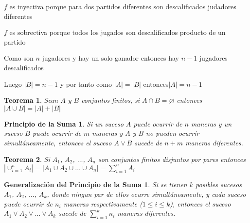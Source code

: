 \documentclass[a4paper,12pt]{report}
\newtheorem*{psm}{Principio de la Suma}
\newtheorem*{gpsm}{Generalización del Principio de la Suma}
\newtheorem*{pie}{Principio de Inclusión - Exclusión}
\newtheorem*{teo}{Teorema}
\begin{document}
 $f$ es inyectiva porque para dos partidos diferentes son descalificados judadores diferentes
 
 $f$ es sobrectiva porque todos los jugados son descalificados producto de un partido
 
 Como son $n$ jugadores y hay un solo ganador entonces hay $n-1$ jugadores descalificados
 
 Luego $|B|=n-1$ y por tanto como $|A|=|B|$ entonces$|A|=n-1$

 
 \begin{teo}
  Sean $A$ y $B$ conjuntos finitos, si $A\cap B = \varnothing$ entonces \\$|A\cup B|=|A|+|B|$
 \end{teo}
% 
% 
% 
% 
 

\begin{psm}
 Si un suceso $A$ puede ocurrir de $n$ maneras y un suceso $B$ puede ocurrir de $m$ maneras y $A$ y $B$ no pueden ocurrir simultáneamente, entonces el suceso $A\vee B$ sucede de $n + m$ maneras diferentes.
\end{psm}

\begin{teo}
 Si $A_1$, $A_2$, $\dots$, $A_n$ son conjuntos finitos disjuntos por pares entonces
 $|\cup^n_{i=1}A_i|=|A_1\cup A_2\cup \dots \cup A_n|=\sum^n_{i=1}A_i$
\end{teo}

\begin{gpsm}
 Si se tienen $k$ posibles sucesos $A_1$, $A_2$, $\dots$, $A_k$, donde ningun par de ellos ocurre simultáneamente, y cada suceso puede ocurrir de $n_i$ maneras respectivamente ($1\leq i \leq k$), entonces el suceso $A_1\vee A_2\vee \dots \vee A_k$ sucede de $\sum^k_{i=1}n_i$ maneras diferentes.
\end{gpsm}
\end{document}
